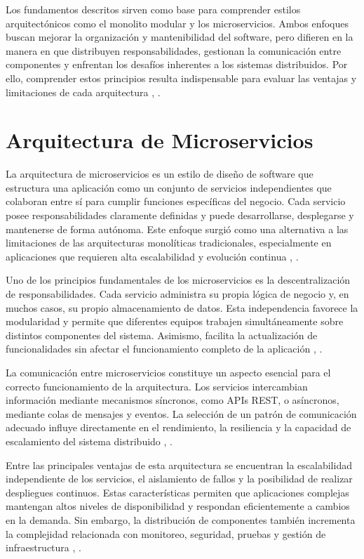 \documentclass[10pt,conference]{IEEEtran}
\begin{document}
Los fundamentos descritos sirven como base para comprender estilos arquitectónicos como el monolito modular y los microservicios. Ambos enfoques buscan mejorar la organización y mantenibilidad del software, pero difieren en la manera en que distribuyen responsabilidades, gestionan la comunicación entre componentes y enfrentan los desafíos inherentes a los sistemas distribuidos. Por ello, comprender estos principios resulta indispensable para evaluar las ventajas y limitaciones de cada arquitectura \cite{ref9}, \cite{ref10}.

\section{Arquitectura de Microservicios}
La arquitectura de microservicios es un estilo de diseño de software que estructura una aplicación como un conjunto de servicios independientes que colaboran entre sí para cumplir funciones específicas del negocio. Cada servicio posee responsabilidades claramente definidas y puede desarrollarse, desplegarse y mantenerse de forma autónoma. Este enfoque surgió como una alternativa a las limitaciones de las arquitecturas monolíticas tradicionales, especialmente en aplicaciones que requieren alta escalabilidad y evolución continua \cite{ref9}, \cite{ref10}.

Uno de los principios fundamentales de los microservicios es la descentralización de responsabilidades. Cada servicio administra su propia lógica de negocio y, en muchos casos, su propio almacenamiento de datos. Esta independencia favorece la modularidad y permite que diferentes equipos trabajen simultáneamente sobre distintos componentes del sistema. Asimismo, facilita la actualización de funcionalidades sin afectar el funcionamiento completo de la aplicación \cite{ref11}, \cite{ref12}.

La comunicación entre microservicios constituye un aspecto esencial para el correcto funcionamiento de la arquitectura. Los servicios intercambian información mediante mecanismos síncronos, como APIs REST, o asíncronos, mediante colas de mensajes y eventos. La selección de un patrón de comunicación adecuado influye directamente en el rendimiento, la resiliencia y la capacidad de escalamiento del sistema distribuido \cite{ref13}, \cite{ref14}.

Entre las principales ventajas de esta arquitectura se encuentran la escalabilidad independiente de los servicios, el aislamiento de fallos y la posibilidad de realizar despliegues continuos. Estas características permiten que aplicaciones complejas mantengan altos niveles de disponibilidad y respondan eficientemente a cambios en la demanda. Sin embargo, la distribución de componentes también incrementa la complejidad relacionada con monitoreo, seguridad, pruebas y gestión de infraestructura \cite{ref15}, \cite{ref16}.
\end{document}
